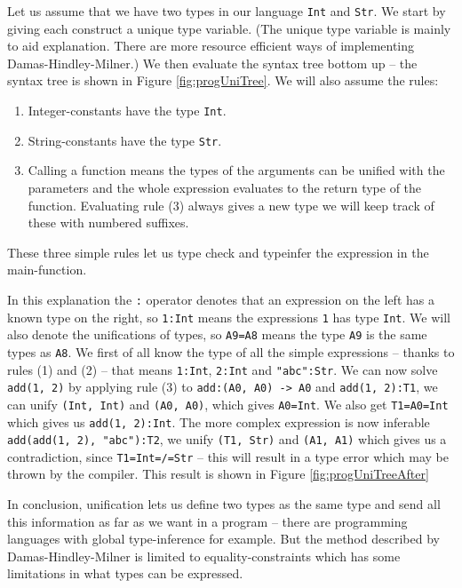 Let us assume that we have two types in our language \verb+Int+ and \verb+Str+. We start by giving each construct a unique type variable. (The unique type variable is mainly to aid explanation. There are more resource efficient ways of implementing Damas-Hindley-Milner.) We then evaluate the syntax tree bottom up -- the syntax tree is shown in Figure \ref{fig:progUniTree}. We will also assume the rules: 
\begin{enumerate}
  \item Integer-constants have the type \verb+Int+.
  \item String-constants have the type \verb+Str+.
  \item Calling a function means the types of the arguments can be unified with the parameters and the whole expression evaluates to the return type of the function. Evaluating rule (3) always gives a new type  we will keep track of these with numbered suffixes.
\end{enumerate}
These three simple rules let us type check and typeinfer the expression in the main-function.

In this explanation the \verb+:+ operator denotes that an expression on the left has a known type on the right, so \verb+1:Int+ means the expressions \verb+1+ has type \verb+Int+. We will also denote the unifications of types, so \verb+A9=A8+ means the type \verb+A9+ is the same types as \verb+A8+. We first of all know the type of all the simple expressions -- thanks to rules (1) and (2) -- that means \verb+1:Int+, \verb+2:Int+ and \verb+"abc":Str+. We can now solve \verb+add(1, 2)+ by applying rule (3) to \verb+add:(A0, A0) -> A0+ and \verb+add(1, 2):T1+, we can unify \verb+(Int, Int)+ and \verb+(A0, A0)+, which gives \verb+A0=Int+. We also get \verb+T1=A0=Int+ which gives us \verb+add(1, 2):Int+. The more complex expression is now inferable \verb+add(add(1, 2), "abc"):T2+, we unify \verb+(T1, Str)+ and \verb+(A1, A1)+ which gives us a contradiction, since \verb+T1=Int=/=Str+ -- this will result in a type error which may be thrown by the compiler. This result is shown in Figure \ref{fig:progUniTreeAfter}

In conclusion, unification lets us define two types as the same type and send all this information as far as we want in a program -- there are programming languages with global type-inference for example. But the method described by Damas-Hindley-Milner is limited to equality-constraints which has some limitations in what types can be expressed.

